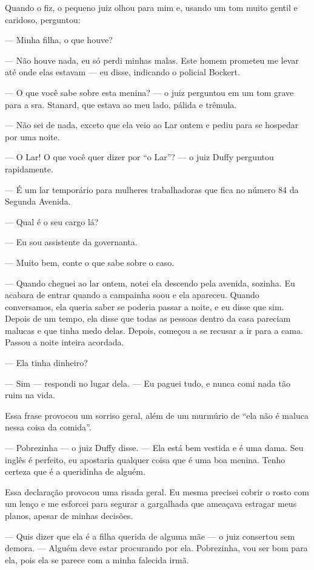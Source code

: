 Quando o fiz, o pequeno juiz olhou para mim e, usando um tom muito
gentil e caridoso, perguntou:

--- Minha filha, o que houve?

--- Não houve nada, eu só perdi minhas malas. Este homem prometeu me
levar até onde elas estavam --- eu disse, indicando o policial Bockert.

--- O que você sabe sobre esta menina? --- o juiz perguntou em um tom
grave para a sra. Stanard, que estava ao meu lado, pálida e trêmula.

--- Não sei de nada, exceto que ela veio ao Lar ontem e pediu para se
hospedar por uma noite.

--- O Lar! O que você quer dizer por ``o Lar''? --- o juiz Duffy
perguntou rapidamente.

--- É um lar temporário para mulheres trabalhadoras que fica no número
84 da Segunda Avenida.

--- Qual é o seu cargo lá?

--- Eu sou assistente da governanta.

--- Muito bem, conte o que sabe sobre o caso.

--- Quando cheguei ao lar ontem, notei ela descendo pela avenida,
sozinha. Eu acabara de entrar quando a campainha soou e ela apareceu.
Quando conversamos, ela queria saber se poderia passar a noite, e eu
disse que sim. Depois de um tempo, ela disse que todas as pessoas dentro
da casa pareciam malucas e que tinha medo delas. Depois, começou a se
recusar a ir para a cama. Passou a noite inteira acordada.

--- Ela tinha dinheiro?

--- Sim --- respondi no lugar dela. --- Eu paguei tudo, e nunca comi
nada tão ruim na vida.

Essa frase provocou um sorriso geral, além de um murmúrio de ``ela não é
maluca nessa coisa da comida''.

--- Pobrezinha --- o juiz Duffy disse. --- Ela está bem vestida e é uma
dama. Seu inglês é perfeito, eu apostaria qualquer coisa que é uma boa
menina. Tenho certeza que é a queridinha de alguém.

Essa declaração provocou uma risada geral. Eu mesma precisei cobrir o
rosto com um lenço e me esforcei para segurar a gargalhada que ameaçava
estragar meus planos, apesar de minhas decisões.

--- Quis dizer que ela é a filha querida de alguma mãe --- o juiz
consertou sem demora. --- Alguém deve estar procurando por ela.
Pobrezinha, vou ser bom para ela, pois ela se parece com a minha
falecida irmã.

